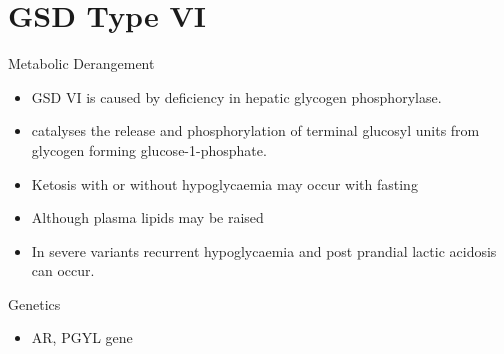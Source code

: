 \documentclass[presentation, smaller]{beamer}
\begin{document}
\section{GSD Type VI}
\label{sec:org2b86296}
\begin{frame}[label={sec:orga473593}]{Metabolic Derangement}
\begin{itemize}
\item GSD VI is caused by deficiency in hepatic glycogen phosphorylase.
\item catalyses the release and phosphorylation of terminal glucosyl units
from glycogen forming glucose-1-phosphate.
\item Ketosis with or without hypoglycaemia may occur with fasting
\item Although plasma lipids may be raised
\item In severe variants recurrent hypoglycaemia and post prandial lactic
acidosis can occur.
\end{itemize}
\end{frame}
\begin{frame}[label={sec:org51dfa74}]{Genetics}
\begin{itemize}
\item AR, PGYL gene
\end{itemize}
\end{frame}
\end{document}
